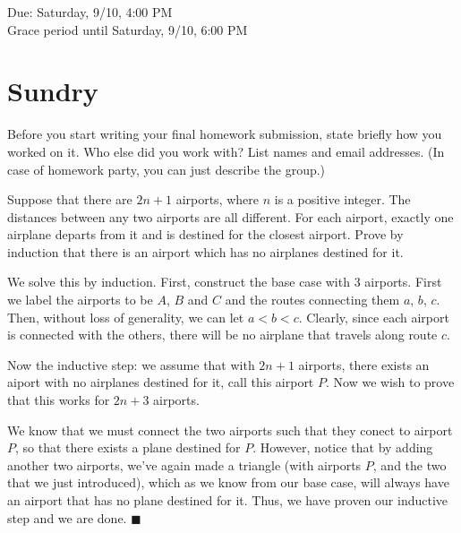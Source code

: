 \documentclass[11pt]{article}
\begin{document}
\maketitle
\fontsize{12}{15}\selectfont

\begin{center}
    Due: Saturday, 9/10, 4:00 PM \\
    Grace period until Saturday, 9/10, 6:00 PM \\
\end{center}

\section*{Sundry}
Before you start writing your final homework submission, state briefly how you worked on it.  Who else did you work with?  List names and email addresses.  (In case of homework party, you can just describe the group.)

{\color{blue}{I did not work with anybody to complete this homework.}}

\vspace{15pt}


Suppose that there are $2n+1$ airports, where $n$ is a positive integer. The distances between any two airports are all different. For each airport, exactly one airplane departs from it and is destined for the closest airport. Prove by induction that there is an airport which has no airplanes destined for it.


\begin{solution}
  We solve this by induction. First, construct the base case with 3 airports. First we label the airports to be $A$, $B$ and $C$ and the routes connecting them $a$, $b$, $c$. Then, without loss of generality, we can let $a < b < c$. Clearly, since each airport is connected with the others, there will be no airplane that travels along route $c$. 

  Now the inductive step: we assume that with $2n+1$ airports, there exists an aiport with no airplanes destined for it, call this airport $P$. Now we wish to prove that this works for $2n + 3$ airports. 

  We know that we must connect the two airports such that they conect to airport $P$, so that there exists a plane destined for $P$. However, notice that by adding another two airports, we've again made a triangle (with airports $P$, and the two that we just introduced), which as we know from our base case, will always have an airport that has no plane destined for it. Thus, we have proven our inductive step and we are done. $\blacksquare$
\end{solution}
\end{document}
